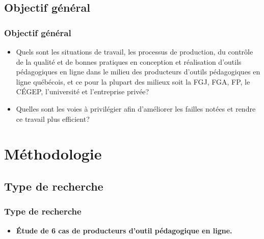                 \subsection{Objectif général} 
		\begin{frame}
			\frametitle{Objectif général}
                        
                        \begin{itemize} 
                        \item  Quels sont les situations de travail, les processus de production, du contrôle de la qualité et de bonnes pratiques en conception et réalisation d’outils pédagogiques en ligne dans le milieu des producteurs d’outils pédagogiques en ligne québécois, et ce pour la plupart des milieux soit la FGJ, FGA, FP, le CÉGEP, l’université et l’entreprise privée? 
                         \item Quelles sont les voies à privilégier afin d’améliorer les failles notées et rendre ce travail plus efficient?

                        \end{itemize}

             
                \end{frame}
                
	\section{Méthodologie} 
		
                        
				\subsection{Type de recherche} 
					\begin{frame}
						\frametitle{Type de recherche}
                        
                        			\begin{itemize} 
                       				 \item \textbf{Étude de 6 cas de producteurs d’outil pédagogique en ligne.} 

                       		 \end{itemize}
				\end{frame}
